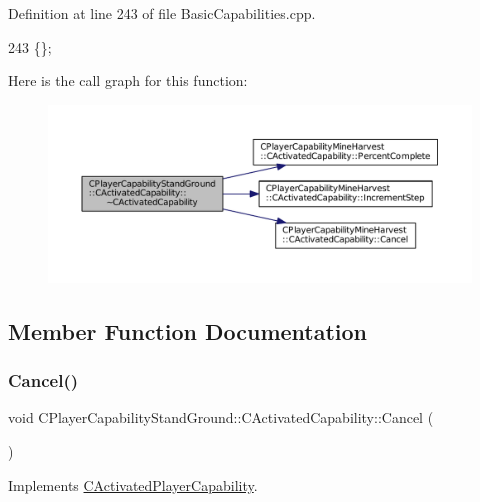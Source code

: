 Definition at line 243 of file Basic\+Capabilities.\+cpp.


\begin{DoxyCode}
243 \{\};
\end{DoxyCode}
Here is the call graph for this function\+:\nopagebreak
\begin{figure}[H]
\begin{center}
\leavevmode
\includegraphics[width=350pt]{classCPlayerCapabilityStandGround_1_1CActivatedCapability_a7fe4c33b38b30befad569944ded1e402_cgraph}
\end{center}
\end{figure}


\subsection{Member Function Documentation}
\hypertarget{classCPlayerCapabilityStandGround_1_1CActivatedCapability_ac75cd8a26726adb60cf045f99059ca7d}{}\label{classCPlayerCapabilityStandGround_1_1CActivatedCapability_ac75cd8a26726adb60cf045f99059ca7d} 
\subsubsection{\texorpdfstring{Cancel()}{Cancel()}}
{\footnotesize\ttfamily void C\+Player\+Capability\+Stand\+Ground\+::\+C\+Activated\+Capability\+::\+Cancel (\begin{DoxyParamCaption}{ }\end{DoxyParamCaption})\hspace{0.3cm}{\ttfamily [virtual]}}



Implements \hyperlink{classCActivatedPlayerCapability_a5cde83be468e262ad054d81e28684a81}{C\+Activated\+Player\+Capability}.



